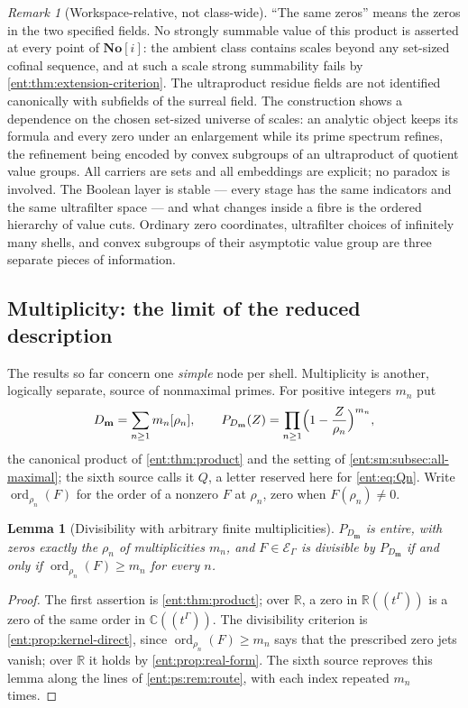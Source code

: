 \documentclass[11pt]{article}
\theoremstyle{plain}
\newtheorem{lemma}[lemma]{Lemma}
\theoremstyle{plain}
\theoremstyle{plain}
\theoremstyle{definition}
\theoremstyle{definition}
\theoremstyle{definition}
\theoremstyle{definition}
\theoremstyle{remark}
\newtheorem{remark}[remark]{Remark}
\newcommand{\C}{\mathbb C}\newcommand{\R}{\mathbb R}
\newcommand{\No}{\mathbf{No}}
\DeclareMathOperator{\ord}{ord}\DeclareMathOperator{\cf}{cf}
\begin{document}
\begin{remark}[Workspace-relative, not class-wide]
``The same zeros'' means the zeros in the two specified fields. No strongly
summable value of this product is asserted at every point of $\No[i]$: the
ambient class contains scales beyond any set-sized cofinal sequence, and at
such a scale strong summability fails by \cref{ent:thm:extension-criterion}. The ultraproduct residue
fields are not identified canonically with subfields of the surreal field.
The construction shows a dependence on the chosen set-sized universe of
scales: an analytic object keeps its formula and every zero under an
enlargement while its prime spectrum refines, the refinement being encoded
by convex subgroups of an ultraproduct of quotient value groups. All
carriers are sets and all embeddings are explicit; no paradox is involved.
The Boolean layer is stable --- every stage has the same indicators and the
same ultrafilter space --- and what changes inside a fibre is the ordered
hierarchy of value cuts. Ordinary zero coordinates, ultrafilter choices of
infinitely many shells, and convex subgroups of their asymptotic value group
are three separate pieces of information.
\end{remark}

\subsection{Multiplicity: the limit of the reduced description}
\label{ent:ps:subsec:multiplicity}

The results so far concern one \emph{simple} node per shell. Multiplicity is
another, logically separate, source of nonmaximal primes. For positive
integers $m_n$ put
\[
 D_{\mathbf m}=\sum_{n\ge1}m_n[\rho_n],\qquad
 P_{D_{\mathbf m}}(Z)=\prod_{n\ge1}\Bigl(1-\frac Z{\rho_n}\Bigr)^{m_n},
\]
the canonical product of \cref{ent:thm:product} and the setting of
\cref{ent:sm:subsec:all-maximal}; the sixth source calls it $Q$, a letter
reserved here for \eqref{ent:eq:Qn}. Write $\ord_{\rho_n}(F)$ for the order of
a nonzero $F$ at $\rho_n$, zero when $F(\rho_n)\ne0$.

\begin{lemma}[Divisibility with arbitrary finite multiplicities]
\label{ent:ps:lem:multiplicity-division}
$P_{D_{\mathbf m}}$ is entire, with zeros exactly the $\rho_n$ of
multiplicities $m_n$, and $F\in\mathcal E_\Gamma$ is divisible by
$P_{D_{\mathbf m}}$ if and only if $\ord_{\rho_n}(F)\ge m_n$ for every $n$.
\end{lemma}
\begin{proof}
The first assertion is \cref{ent:thm:product}; over $\R$, a zero in
$\R((t^\Gamma))$ is a zero of the same order in $\C((t^\Gamma))$. The
divisibility criterion is \cref{ent:prop:kernel-direct}, since
$\ord_{\rho_n}(F)\ge m_n$ says that the prescribed zero jets vanish; over
$\R$ it holds by \cref{ent:prop:real-form}. The sixth source reproves this
lemma along the lines of \cref{ent:ps:rem:route}, with each index repeated
$m_n$ times.
\end{proof}
\end{document}
